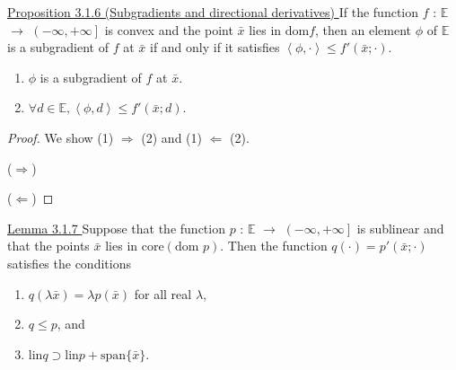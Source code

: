 \documentclass[a4paper,11pt]{jsarticle}
\begin{document}
\begin{itembox}[l]{\underline{Proposition 3.1.6 (Subgradients and directional derivatives) }}
  If the function $f$ : $\mathbb{E}$ $\to$ $ \left ( -\infty ,+\infty \right ] $ is convex and the point $\bar{x}$ lies in $\text{dom}f$, then an element $\phi$ of $\mathbb{E}$ is a subgradient of $f$ at $\bar{x}$ if and only if it satisfies $\left\langle \phi,\cdot \right\rangle \leq f'(\bar{x};\cdot)$.
\end{itembox}

  \begin{enumerate}[label=\arabic*,align=CenterWithParen]
    \item $\phi$ is a subgradient of $f$ at $\bar{x}$.
    \item $\forall d \in \mathbb{E}, \left\langle \phi,d \right\rangle \leq f'(\bar{x};d)$.
  \end{enumerate}

\begin{proof}

  We show (1) $\Rightarrow$ (2) and (1) $\Leftarrow$ (2).

  ($\Rightarrow$)

  ($\Leftarrow$)

\end{proof}

\begin{center}
\end{center}

\begin{itembox}[l]{\underline{Lemma 3.1.7 }}
  Suppose that the function $p$ : $\mathbb{E}$ $\to$ $ \left ( -\infty ,+\infty \right ] $ is sublinear and that the points $\bar{x}$ lies in $\text{core}(\text{dom }p)$. Then the function $q(\cdot) = p'(\bar{x};\cdot)$ satisfies the conditions

  \begin{enumerate}[label=\roman*,align=CenterWithParen]
    \item $q(\lambda \bar{x}) = \lambda p (\bar{x})$ for all real $\lambda$,
    \item $q \leq p$, and
    \item $\text{lin}q \supset \text{lin}p + \text{span}\{\bar{x}\}$.
  \end{enumerate}
\end{itembox}
\end{document}
